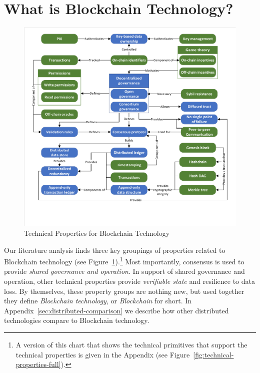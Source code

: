 
\section{What is Blockchain Technology?}
\label{sec:blockchain}

\begin{figure}
	\centering
	\includegraphics[page=2,width=\columnwidth]{figures/grounded-theory-main}
	
	\caption{Technical Properties for Blockchain Technology}
	\label{fig:technical-properties}
\end{figure}

Our literature analysis finds three key groupings of properties related to Blockchain technology (see Figure~\ref{fig:technical-properties}).\footnote{A version of this chart that shows the technical primitives that support the technical properties is given in the Appendix (see Figure~\ref{fig:technical-properties-full}).}
Most importantly, consensus is used to provide \textit{shared governance and operation}.
In support of shared governance and operation, other technical properties provide \textit{verifiable state} and {resilience to data loss}.
By themselves, these property groups are nothing new, but used together they define \emph{Blockchain technology}, or \emph{Blockchain} for short.
In Appendix~\ref{sec:distributed-comparison} we describe how other distributed technologies compare to Blockchain technology.

